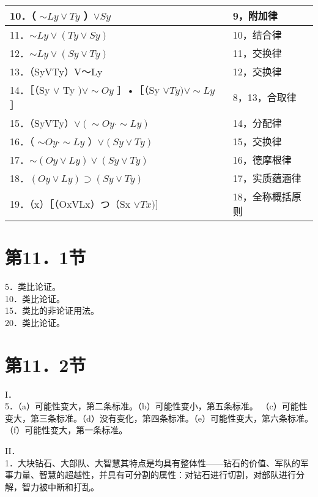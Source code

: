 \begin{center}
\begin{tabular}{|l|l|}
\hline
10．（ $\sim L y \vee T y$ ）$\vee S y$ & 9，附加律 \\
\hline
11．$\sim L y \vee(T y \vee S y)$ & 10，结合律 \\
\hline
12．$\sim L y \vee(S y \vee T y)$ & 11，交换律 \\
\hline
13．（SyVTy）V～Ly & 12，交换律 \\
\hline
14．［（Sy $\vee$ Ty $) \vee \sim O y$ ］•［（Sy $\vee T y) \vee \sim L y$ ］ & 8，13，合取律 \\
\hline
15．（SyVTy）$\vee(\sim O y \cdot \sim L y)$ & 14，分配律 \\
\hline
16．（ $\sim O y \cdot \sim L y$ ）$\vee(S y \vee T y)$ & 15，交换律 \\
\hline
17．$\sim(O y \vee L y) \vee(S y \vee T y)$ & 16，德摩根律 \\
\hline
18．$(O y \vee L y) \supset(S y \vee T y)$ & 17，实质蕴涵律 \\
\hline
19．（x）［（OxVLx）つ（Sx $\vee T x)]$ & 18，全称概括原则 \\
\hline
\end{tabular}
\end{center}

\section*{第11．1节}
5．类比论证。\\
10．类比论证。\\
15．类比的非论证用法。\\
20．类比论证。

\section*{第11．2节}
I．\\
5．（a）可能性变大，第二条标准。（b）可能性变小，第五条标准。 （c）可能性变大，第三条标准。（d）没有变化，第四条标准。（e）可能性变大，第六条标准。（f）可能性变大，第一条标准。

II．\\
1．大块钻石、大部队、大智慧其特点是均具有整体性——钻石的价值、军队的军事力量、智慧的超越性，并具有可分割的属性：对钻石进行切割，对部队进行分解，智力被中断和打乱。

